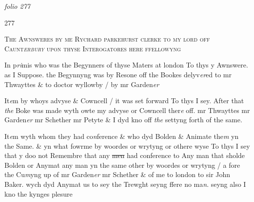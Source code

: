 \documentclass[12pt, a4paper]{book}
\begin{document}
\textit{folio 277}



            		\begin{flushright}{\color{Mahogany}277}\end{flushright}


				\begin{center}  {\scshape The Awnsweres by me Rychard parkehurst clerke to my lord off
Caunt\textit{erbury }upon\textit{ }thyse Interogatores here ffellowyng}  \end{center}
			


				\marginpar[\vspace{0.5cm}{\textcolor{Gray}{1}}]{}
			

		\ifthenelse{\isodd{\thepage}}
		{\reversemarginpar}
		{\normalmarginpar}
		In p\textit{ri}mis who was the Begynners of thyse Maters at london
To thys y Awnswere. as I Suppose. the Begynnyng was by Resone off
the Bookes delyv\textit{er}ed to mr Thwayttes \& to doctor wyllowby / by mr Garden\textit{er}
            		
				\marginpar[\vspace{0.5cm}{\textcolor{Gray}{2}}]{}
			
 
		\ifthenelse{\isodd{\thepage}}
		{\reversemarginpar}
		{\normalmarginpar}
		It\textit{e}m by whoys advyse \& Cowncell / it was set forward
To thys I sey. After that \textit{the} Boke was made wyth owte my advyse
or Cowncell ther\textit{e} off. mr Thwayttes mr Garden\textit{er} mr Schether mr
Petyte \& I dyd kno off \textit{the} settyng forth of the same.

            		
				\marginpar[\vspace{0.5cm}{\textcolor{Gray}{3}}]{}
			

		\ifthenelse{\isodd{\thepage}}
		{\reversemarginpar}
		{\normalmarginpar}
		 It\textit{e}m wyth whom they had co\textit{n}ference \& who dyd Bolden \& Animate
the\textit{m} yn the Same. \& yn what fowrme by woordes or wrytyng or othere wyse
To thys I sey that y doo not Remembre that any \sout{men }had conference to Any man
that sholde Bolden or Anymat any man yn the same other by woordes
or wrytyng / a fore the Cu\textit{m}yng up of mr Garden\textit{er} mr Schether \& of
			 me
to london to sir John Baker. wych dyd Anymat us to sey the Trewght seyng
ffere no ma\textit{n}. seyng also I kno the kynges plesure
            		
				\marginpar[\vspace{0.5cm}{\textcolor{Gray}{4}}]{}
			
\end{document}
